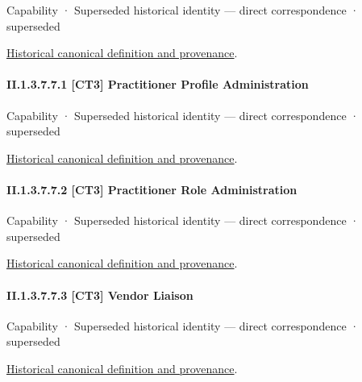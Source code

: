 \label{element:a352fd50419d451887c85fcb98566cd5}
{\small Capability · Superseded historical identity — direct correspondence · superseded}\par
\href{../../../../continuum/strategy/capability/a352fd50419d451887c85fcb98566cd5.md}{Historical canonical definition and provenance}.\par
\paragraph*{II.1.3.7.7.1 [CT3] Practitioner Profile Administration}
\label{navigation:II.1.3.7.7.1}

\label{element:2415ddcbc73c47e1a63be310bd4342ee}
{\small Capability · Superseded historical identity — direct correspondence · superseded}\par
\href{../../../../continuum/strategy/capability/2415ddcbc73c47e1a63be310bd4342ee.md}{Historical canonical definition and provenance}.\par
\paragraph*{II.1.3.7.7.2 [CT3] Practitioner Role Administration}
\label{navigation:II.1.3.7.7.2}

\label{element:6b777f1201db474eb22dd89f2b1f68c6}
{\small Capability · Superseded historical identity — direct correspondence · superseded}\par
\href{../../../../continuum/strategy/capability/6b777f1201db474eb22dd89f2b1f68c6.md}{Historical canonical definition and provenance}.\par
\paragraph*{II.1.3.7.7.3 [CT3] Vendor Liaison}
\label{navigation:II.1.3.7.7.3}

\label{element:29076cbb9fc5442fb25faf43947574f7}
{\small Capability · Superseded historical identity — direct correspondence · superseded}\par
\href{../../../../continuum/strategy/capability/29076cbb9fc5442fb25faf43947574f7.md}{Historical canonical definition and provenance}.\par
